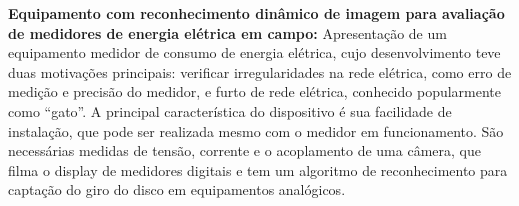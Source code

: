\textbf{Equipamento com reconhecimento dinâmico de imagem para avaliação de
medidores de energia elétrica em campo:}
Apresentação de um equipamento medidor de consumo de energia elétrica, cujo
desenvolvimento teve duas motivações principais: verificar irregularidades na
rede elétrica, como erro de medição e precisão do medidor, e furto de rede
elétrica, conhecido popularmente como ``gato''. A principal característica do
dispositivo é sua facilidade de instalação, que pode ser realizada mesmo
com o medidor em funcionamento. São necessárias medidas de tensão, corrente e o
acoplamento de uma câmera, que filma o display de medidores digitais e tem um
algoritmo de reconhecimento para captação do giro do disco em equipamentos
analógicos.
